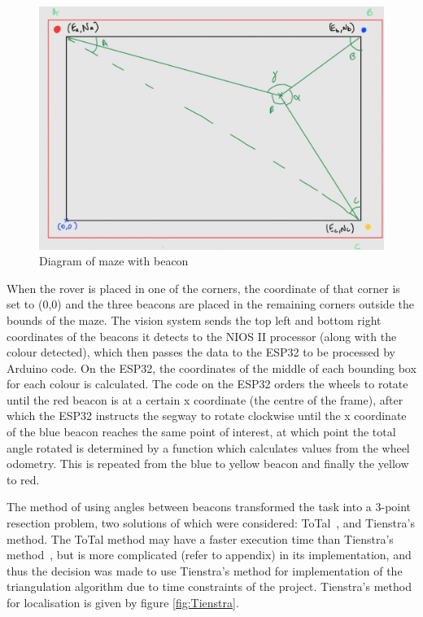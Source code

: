 \begin{figure}
    \centering
    \includegraphics{images/triangulation.jpg}
    \caption{Diagram of maze with beacon}
\end{figure}

When the rover is placed in one of the corners, the coordinate of that corner is set to (0,0) and the three beacons are placed in the remaining corners outside the bounds of the maze. The vision system sends the top left and bottom right coordinates of the beacons it detects to the NIOS II processor (along with the colour detected), which then passes the data to the ESP32 to be processed by Arduino code. On the ESP32, the coordinates of the middle of each bounding box for each colour is calculated. The code on the ESP32 orders the wheels to rotate until the red beacon is at a certain x coordinate (the centre of the frame), after which the ESP32 instructs the segway to rotate clockwise until the x coordinate of the blue beacon reaches the same point of interest, at which point the total angle rotated is determined by a function which calculates values from the wheel odometry.  This is repeated from the blue to yellow beacon and finally the yellow to red. 

The method of using angles between beacons transformed the task into a 3-point resection problem, two solutions of which were considered: ToTal~\cite{ref:6693716}, and Tienstra’s method. The ToTal method may have a faster execution time than Tienstra’s method~\cite{ref:6693716}, but is more complicated (refer to appendix) in its implementation, and thus the decision was made to use Tienstra’s method for implementation of the triangulation algorithm due to time constraints of the project. Tienstra’s method for localisation is given by figure \ref{fig:Tienstra}.

